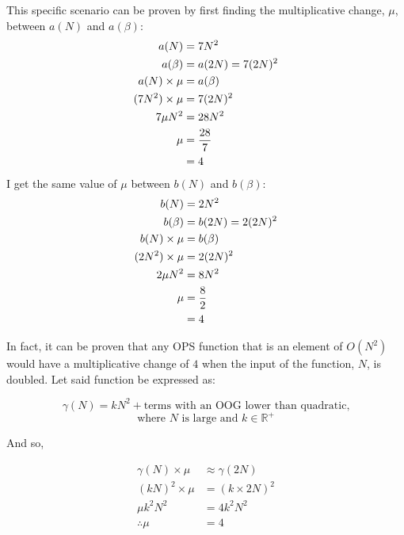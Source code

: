 \documentclass[12pt]{article}
\begin{document}
This specific scenario can be proven by first finding the multiplicative change, $\mu$, between $a(N)$ and $a(\beta)$:
\vspace{-2em}
\begingroup
\allowdisplaybreaks
\begin{align*}
    a(N) &= 7 N^2\\
    a(\beta) &= a(2N) = 7(2N)^2\\
    \vspace{0.5em}
    a(N) \times \mu &= a(\beta)\\
    (7 N^2) \times \mu &= 7(2N)^2\\
    7 \mu N^2 &= 28 N^2\\
    \mu &= \frac{28}{7}\\
    &= 4
\end{align*}
\endgroup
I get the same value of $\mu$ between $b(N)$ and $b(\beta)$:
\begingroup
\allowdisplaybreaks
\begin{align*}
    b(N) &= 2N^2\\
    b(\beta) &= b(2N) = 2(2N)^2\\
    \vspace{0.5em}
    b(N) \times \mu &= b(\beta)\\
    (2 N^2) \times \mu &= 2(2N)^2\\
    2 \mu N^2 &= 8 N^2\\
    \mu &= \frac{8}{2}\\
    &= 4
\end{align*}
\endgroup

In fact, it can be proven that any OPS function that is an element of $O(N^2)$ would have a multiplicative change of $4$ when the input of the function, $N$, is doubled. Let said function be expressed as:\newline

\begingroup
\onehalfspacing
\[\gamma(N) = kN^2 + \text{terms with an OOG lower than quadratic,}\]
\[\text{where $N$ is large and $k\in \mathbb{R}^+$}\]
\endgroup

And so,\vspace{-2em}

\begingroup
\allowdisplaybreaks
\onehalfspacing
\begin{align*}
    \gamma(N) \times \mu &\approx \gamma(2N)\\
    (kN)^2 \times \mu &= (k \times 2N)^2\\
    \mu k^2 N^2 &= 4 k^2 N^2\\
    \therefore \mu &= 4
\end{align*}
\endgroup
\end{document}
